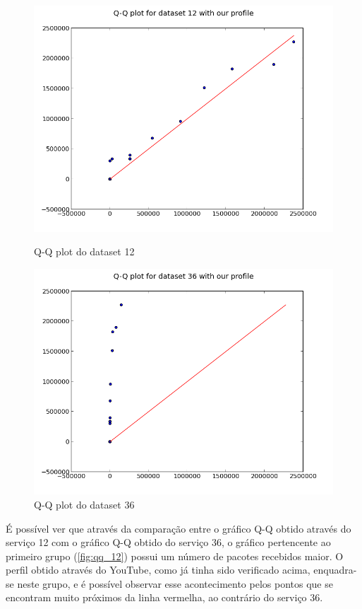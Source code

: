 \documentclass[pdftex,12pt,a4paper]{report}
\begin{document}
\begin{figure}[!htb]
  \centering
  \begin{minipage}[b]{0.4\textwidth}
    \includegraphics[width=\textwidth]{qq_pp/qq_plot_12.png}
    \caption{Q-Q plot do dataset 12}
    \label{fig:qq_12}
  \end{minipage}
  \hfill
  \begin{minipage}[b]{0.4\textwidth}
    \includegraphics[width=\textwidth]{qq_pp/qq_plot_36.png}
    \caption{Q-Q plot do dataset 36}
    \label{fig:qq_36}
  \end{minipage}
\end{figure}

É possível ver que através da comparação entre o gráfico Q-Q obtido através do serviço 12 com o gráfico Q-Q obtido do serviço 36, o gráfico pertencente ao primeiro grupo (\ref{fig:qq_12}) possui um número de pacotes recebidos maior. O perfil obtido através do YouTube, como já tinha sido verificado acima, enquadra-se neste grupo, e é possível observar esse acontecimento pelos pontos que se encontram muito próximos da linha vermelha, ao contrário do serviço 36.
\end{document}
